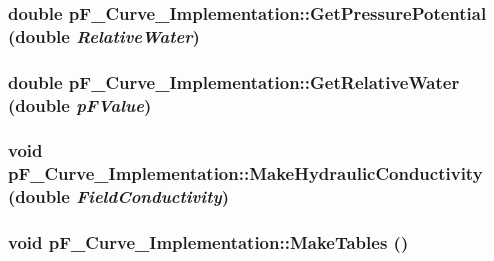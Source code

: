 \label{classp_f___curve___implementation_a25faa888ce16f43ff602c46721f8487d}
\hypertarget{classp_f___curve___implementation_a813897da0ebdbb1bda26ce032f664a9e}{
\subsubsection[{GetPressurePotential}]{\setlength{\rightskip}{0pt plus 5cm}double pF\_\-Curve\_\-Implementation::GetPressurePotential (double {\em RelativeWater})}}
\label{classp_f___curve___implementation_a813897da0ebdbb1bda26ce032f664a9e}
\hypertarget{classp_f___curve___implementation_aec0be188214cdef70e5b56c1a4af4889}{
\subsubsection[{GetRelativeWater}]{\setlength{\rightskip}{0pt plus 5cm}double pF\_\-Curve\_\-Implementation::GetRelativeWater (double {\em pFValue})}}
\label{classp_f___curve___implementation_aec0be188214cdef70e5b56c1a4af4889}
\hypertarget{classp_f___curve___implementation_a7513fc9233b0844f592e904e1b17cb81}{
\subsubsection[{MakeHydraulicConductivity}]{\setlength{\rightskip}{0pt plus 5cm}void pF\_\-Curve\_\-Implementation::MakeHydraulicConductivity (double {\em FieldConductivity})}}
\label{classp_f___curve___implementation_a7513fc9233b0844f592e904e1b17cb81}
\hypertarget{classp_f___curve___implementation_ada7b4e4d08e6af2dc5df656853506104}{
\subsubsection[{MakeTables}]{\setlength{\rightskip}{0pt plus 5cm}void pF\_\-Curve\_\-Implementation::MakeTables ()}}
